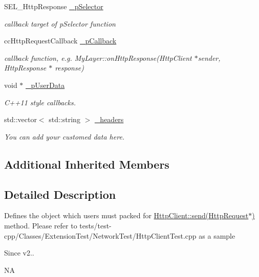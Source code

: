 \begin{DoxyCompactItemize}
\mbox{\label{classnetwork_1_1HttpRequest_a9087f937d342396874a1ced1123e5ceb}} 
S\+E\+L\+\_\+\+Http\+Response \hyperlink{classnetwork_1_1HttpRequest_a9087f937d342396874a1ced1123e5ceb}{\+\_\+p\+Selector}
\begin{DoxyCompactList}\small\item\em callback target of p\+Selector function \end{DoxyCompactList}\item 
\mbox{\label{classnetwork_1_1HttpRequest_a436ad53072c69a77ce7bc3c06561d0e2}} 
cc\+Http\+Request\+Callback \hyperlink{classnetwork_1_1HttpRequest_a436ad53072c69a77ce7bc3c06561d0e2}{\+\_\+p\+Callback}
\begin{DoxyCompactList}\small\item\em callback function, e.\+g. My\+Layer\+::on\+Http\+Response(\+Http\+Client $\ast$sender, Http\+Response $\ast$ response) \end{DoxyCompactList}\item 
\mbox{\label{classnetwork_1_1HttpRequest_a6d152570c93a25ba63f2cfa8b4de1b74}} 
void $\ast$ \hyperlink{classnetwork_1_1HttpRequest_a6d152570c93a25ba63f2cfa8b4de1b74}{\+\_\+p\+User\+Data}
\begin{DoxyCompactList}\small\item\em C++11 style callbacks. \end{DoxyCompactList}\item 
\mbox{\label{classnetwork_1_1HttpRequest_a3641519765b2647452bf982171ed6375}} 
std\+::vector$<$ std\+::string $>$ \hyperlink{classnetwork_1_1HttpRequest_a3641519765b2647452bf982171ed6375}{\+\_\+headers}
\begin{DoxyCompactList}\small\item\em You can add your customed data here. \end{DoxyCompactList}\end{DoxyCompactItemize}
\subsection*{Additional Inherited Members}


\subsection{Detailed Description}
Defines the object which users must packed for \hyperlink{classnetwork_1_1HttpClient_a912e8ba506a485bf5fcc2d06293f118b}{Http\+Client\+::send(\+Http\+Request$\ast$)} method. Please refer to tests/test-\/cpp/\+Classes/\+Extension\+Test/\+Network\+Test/\+Http\+Client\+Test.\+cpp as a sample \begin{DoxySince}{Since}
v2..
\end{DoxySince}
NA 

